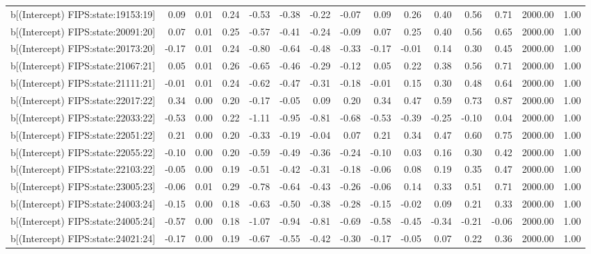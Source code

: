 \begin{table}[ht]
\begin{tabular}{rrrrrrrrrrrrrrr}
  b[(Intercept) FIPS:state:19153:19] & 0.09 & 0.01 & 0.24 & -0.53 & -0.38 & -0.22 & -0.07 & 0.09 & 0.26 & 0.40 & 0.56 & 0.71 & 2000.00 & 1.00 \\ 
  b[(Intercept) FIPS:state:20091:20] & 0.07 & 0.01 & 0.25 & -0.57 & -0.41 & -0.24 & -0.09 & 0.07 & 0.25 & 0.40 & 0.56 & 0.65 & 2000.00 & 1.00 \\ 
  b[(Intercept) FIPS:state:20173:20] & -0.17 & 0.01 & 0.24 & -0.80 & -0.64 & -0.48 & -0.33 & -0.17 & -0.01 & 0.14 & 0.30 & 0.45 & 2000.00 & 1.00 \\ 
  b[(Intercept) FIPS:state:21067:21] & 0.05 & 0.01 & 0.26 & -0.65 & -0.46 & -0.29 & -0.12 & 0.05 & 0.22 & 0.38 & 0.56 & 0.71 & 2000.00 & 1.00 \\ 
  b[(Intercept) FIPS:state:21111:21] & -0.01 & 0.01 & 0.24 & -0.62 & -0.47 & -0.31 & -0.18 & -0.01 & 0.15 & 0.30 & 0.48 & 0.64 & 2000.00 & 1.00 \\ 
  b[(Intercept) FIPS:state:22017:22] & 0.34 & 0.00 & 0.20 & -0.17 & -0.05 & 0.09 & 0.20 & 0.34 & 0.47 & 0.59 & 0.73 & 0.87 & 2000.00 & 1.00 \\ 
  b[(Intercept) FIPS:state:22033:22] & -0.53 & 0.00 & 0.22 & -1.11 & -0.95 & -0.81 & -0.68 & -0.53 & -0.39 & -0.25 & -0.10 & 0.04 & 2000.00 & 1.00 \\ 
  b[(Intercept) FIPS:state:22051:22] & 0.21 & 0.00 & 0.20 & -0.33 & -0.19 & -0.04 & 0.07 & 0.21 & 0.34 & 0.47 & 0.60 & 0.75 & 2000.00 & 1.00 \\ 
  b[(Intercept) FIPS:state:22055:22] & -0.10 & 0.00 & 0.20 & -0.59 & -0.49 & -0.36 & -0.24 & -0.10 & 0.03 & 0.16 & 0.30 & 0.42 & 2000.00 & 1.00 \\ 
  b[(Intercept) FIPS:state:22103:22] & -0.05 & 0.00 & 0.19 & -0.51 & -0.42 & -0.31 & -0.18 & -0.06 & 0.08 & 0.19 & 0.35 & 0.47 & 2000.00 & 1.00 \\ 
  b[(Intercept) FIPS:state:23005:23] & -0.06 & 0.01 & 0.29 & -0.78 & -0.64 & -0.43 & -0.26 & -0.06 & 0.14 & 0.33 & 0.51 & 0.71 & 2000.00 & 1.00 \\ 
  b[(Intercept) FIPS:state:24003:24] & -0.15 & 0.00 & 0.18 & -0.63 & -0.50 & -0.38 & -0.28 & -0.15 & -0.02 & 0.09 & 0.21 & 0.33 & 2000.00 & 1.00 \\ 
  b[(Intercept) FIPS:state:24005:24] & -0.57 & 0.00 & 0.18 & -1.07 & -0.94 & -0.81 & -0.69 & -0.58 & -0.45 & -0.34 & -0.21 & -0.06 & 2000.00 & 1.00 \\ 
  b[(Intercept) FIPS:state:24021:24] & -0.17 & 0.00 & 0.19 & -0.67 & -0.55 & -0.42 & -0.30 & -0.17 & -0.05 & 0.07 & 0.22 & 0.36 & 2000.00 & 1.00 \\ 

\end{tabular}
\end{table}

